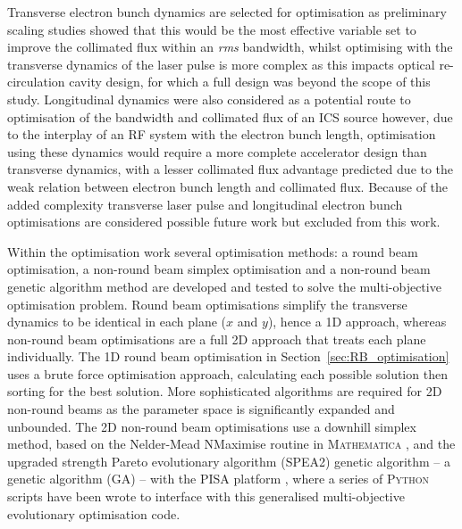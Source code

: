 \documentclass[../main.tex]{subfiles}
\begin{document}
Transverse electron bunch dynamics are selected for optimisation as preliminary scaling studies showed that this would be the most effective variable set to improve the collimated flux within an \textit{rms} bandwidth, whilst optimising with the transverse dynamics of the laser pulse is more complex as this impacts optical re-circulation cavity design, for which a full design was beyond the scope of this study. Longitudinal dynamics were also considered as a potential route to optimisation of the bandwidth and collimated flux of an ICS source however, due to the interplay of an RF system with the electron bunch length, optimisation using these dynamics would require a more complete accelerator design than transverse dynamics, with a lesser collimated flux advantage predicted due to the weak relation between electron bunch length and collimated flux. Because of the added complexity transverse laser pulse and longitudinal electron bunch optimisations are considered possible future work but excluded from this work.   

Within the optimisation work several optimisation methods: a round beam optimisation, a non-round beam simplex optimisation and a non-round beam genetic algorithm method are developed and tested to solve the multi-objective optimisation problem. Round beam optimisations simplify the transverse dynamics to be identical in each plane ($x$ and $y$), hence a 1D approach, whereas non-round beam optimisations are a full 2D approach that treats each plane individually. The 1D round beam optimisation in Section~\ref{sec:RB_optimisation} uses a brute force optimisation approach, calculating each possible solution then sorting for the best solution. More sophisticated algorithms are required for 2D non-round beams as the parameter space is significantly expanded and unbounded.  The 2D non-round beam optimisations use a downhill simplex method, based on the Nelder-Mead NMaximise routine in \textsc{Mathematica} \cite{wolfram2021nmaximize}, and the upgraded strength Pareto evolutionary algorithm (\textsc{SPEA2}) genetic algorithm \cite{zitzler2001spea2} -- a genetic algorithm (GA) -- with the \textsc{PISA} platform \cite{bleuler2003pisa}, where a series of \textsc{Python} scripts have been wrote to interface with this generalised multi-objective evolutionary optimisation code.    
\end{document}
